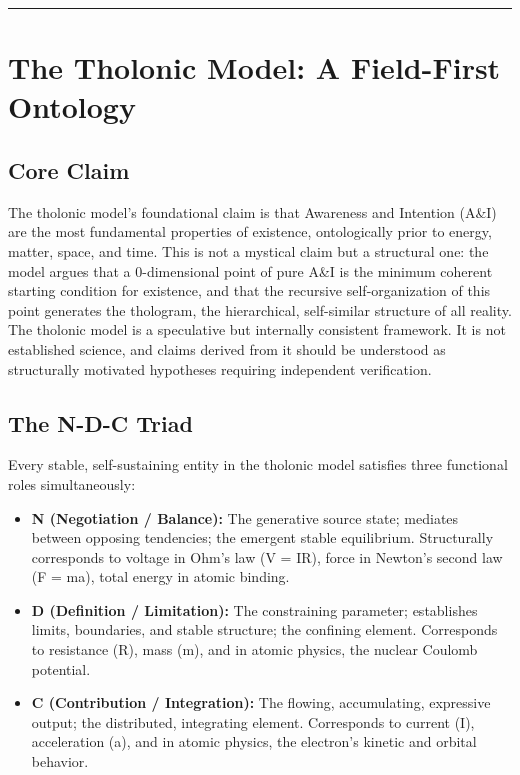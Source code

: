 \documentclass[12pt]{article}
\providecommand{\tightlist}{%
  \setlength{\itemsep}{0pt}\setlength{\parskip}{0pt}}
\begin{document}
\begin{center}\rule{0.5\linewidth}{0.5pt}\end{center}

\section{The Tholonic Model: A Field-First Ontology}\label{the-tholonic-model-a-field-first-ontology}

\subsection{Core Claim}\label{core-claim}

The tholonic model's foundational claim is that Awareness and Intention
(A\&I) are the most fundamental properties of existence, ontologically
prior to energy, matter, space, and time. This is not a mystical claim
but a structural one: the model argues that a 0-dimensional point of
pure A\&I is the minimum coherent starting condition for existence, and
that the recursive self-organization of this point generates the
thologram, the hierarchical, self-similar structure of all reality. The
tholonic model is a speculative but internally consistent framework. It
is not established science, and claims derived from it should be
understood as structurally motivated hypotheses requiring independent
verification.

\subsection{The N-D-C Triad}\label{the-n-d-c-triad}

Every stable, self-sustaining entity in the tholonic model satisfies
three functional roles simultaneously:

\begin{itemize}
\tightlist
\item
  \textbf{N (Negotiation / Balance):} The generative source state;
  mediates between opposing tendencies; the emergent stable equilibrium.
  Structurally corresponds to voltage in Ohm's law (V = IR), force in
  Newton's second law (F = ma), total energy in atomic binding.
\item
  \textbf{D (Definition / Limitation):} The constraining parameter;
  establishes limits, boundaries, and stable structure; the confining
  element. Corresponds to resistance (R), mass (m), and in atomic
  physics, the nuclear Coulomb potential.
\item
  \textbf{C (Contribution / Integration):} The flowing, accumulating,
  expressive output; the distributed, integrating element. Corresponds
  to current (I), acceleration (a), and in atomic physics, the
  electron's kinetic and orbital behavior.
\end{itemize}
\end{document}
